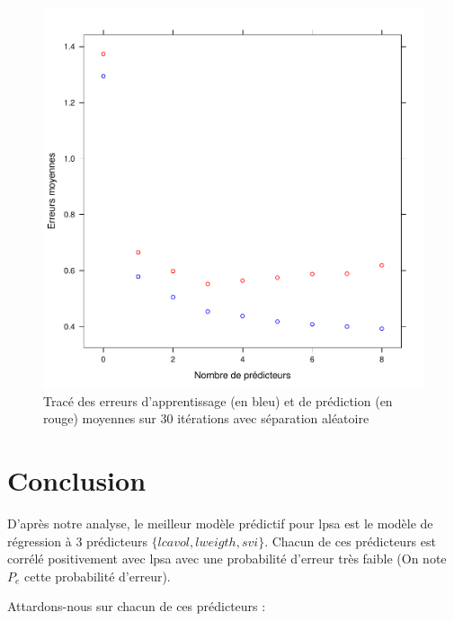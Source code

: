 \documentclass[a4paper, 12pt]{article}
\begin{document}
\begin{enumerate}
\begin{figure}
\begin{center}
\includegraphics[scale=1]{erreurs_moy_moy.pdf}
\caption{Tracé des erreurs d'apprentissage (en bleu) et de prédiction (en rouge) moyennes sur 30 itérations avec séparation aléatoire}
\end{center}
\end{figure}

\end{enumerate}


\section{Conclusion}

D'après notre analyse, le meilleur modèle prédictif pour lpsa est le modèle de régression à 3 prédicteurs $\{lcavol, lweigth, svi\}$. 
Chacun de ces prédicteurs est corrélé positivement avec lpsa avec une probabilité d'erreur très faible (On note $P_{e}$ cette probabilité d'erreur).

Attardons-nous sur chacun de ces prédicteurs :
\end{document}
